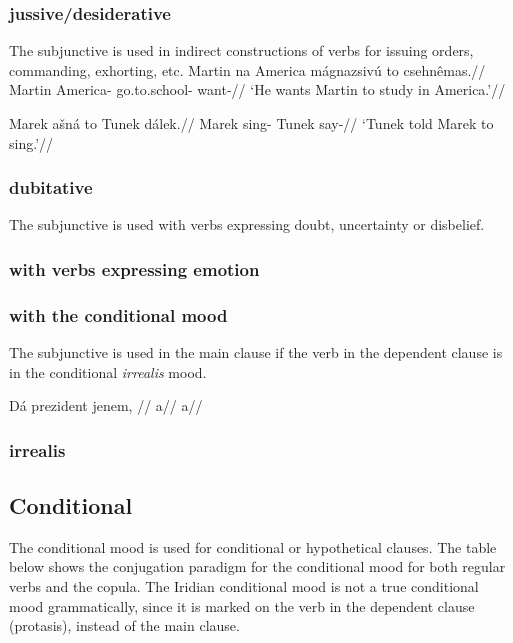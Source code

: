 \subsubsection{jussive/desiderative}
\par The subjunctive is used in indirect constructions of verbs for issuing orders, commanding, exhorting, etc.
\pex
\begingl
\gla Martin na America mágnazsivú to csehnêmas.//
\glb Martin  America- go.to.school-  want-//
\glft `He wants Martin to study in America.'//
\endgl
\xe

\pex
\begingl
\gla Marek a\v{s}ná to Tunek dálek.//
\glb Marek sing-  Tunek say-//
\glft `Tunek told Marek to sing.'//
\endgl
\xe

\subsubsection{dubitative}
\par The subjunctive is used with verbs expressing doubt, uncertainty or disbelief.

\subsubsection{with verbs expressing emotion}


\subsubsection{with the conditional mood}
\par The subjunctive is used in the main clause if the verb in the dependent clause is in the conditional \textit{irrealis} mood.

\pex
\begingl
\gla Dá prezident jenem, //
\glb a//
\glft a//
\endgl
\xe

\subsubsection{irrealis}

\subsection{Conditional}
\par The conditional mood is used for conditional or hypothetical clauses. The table below shows the conjugation paradigm for the conditional mood for both regular verbs and the copula. The Iridian conditional mood is not a true conditional mood grammatically, since it is marked on the verb in the dependent clause (protasis), instead of the main clause.


